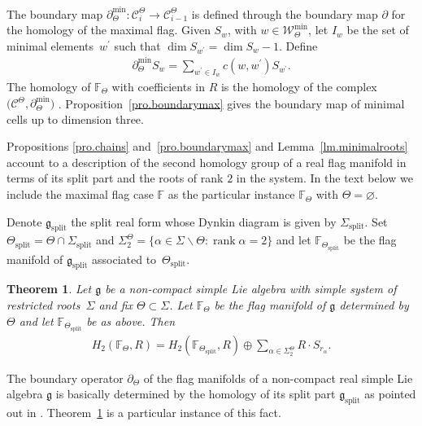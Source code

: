 \documentclass[10pt,a4paper]{amsart}
\numberwithin{equation}{section}
\newtheorem{Theorem}{Theorem}[section]
\begin{document}
The boundary map $\partial_\Theta^{\min}\colon \mathcal{C}_i^\Theta\longrightarrow \mathcal{C}_{i-1}^\Theta$ is defined through the boundary map $\partial$ for the homology of the maximal flag. Given $S_w$, with $w\in \mathcal{W}_\Theta^{\min}$, let $I_w$ be the set of minimal elements~$w^{\prime }$ such that $\dim S_{w^{\prime }}=\dim S_w-1$. Define
\begin{gather*} \partial^{\min}_\Theta S_w=\sum_{w^{\prime }\in I_w}c(w,w^{\prime })S_{w^{\prime }}.\end{gather*} The homology
of $\mathbb{F}_\Theta$ with coefficients in $R$ is the homo\-logy of the complex $\big(\mathcal{C}^\Theta,\partial^{\min}_\Theta\big)$ \cite[Theorem~3.4]{RSM}. Proposition~\ref{pro.boundarymax} gives the boundary map of minimal cells up to dimension three.

Propositions \ref{pro.chains} and~\ref{pro.boundarymax} and Lemma~\ref{lm.minimalroots} account to a description of the second homology group of a real flag manifold in terms of its split part and the roots of rank $2$ in the system. In the text below we include the maximal flag case $\mathbb F$ as the particular instance $\mathbb F_\Theta$ with $\Theta=\varnothing$.

Denote $\mathfrak{g }_{\mathrm{split}}$ the split real form whose Dynkin diagram is given by $\Sigma_{\mathrm{split}}$. Set $\Theta_{\mathrm{split}}=\Theta\cap\Sigma_{\mathrm{split}}$ and $\Sigma _{2}^{\Theta }=\{\alpha \in \Sigma \backslash \Theta \colon \operatorname{rank}\alpha =2\}$ and let $\mathbb{F}_{\Theta_{\mathrm{split}}}$ be the flag manifold of $\mathfrak{g }_{\mathrm{split}}$ associated to~$\Theta_{\mathrm{split}}$.

\begin{Theorem} \label{thm.nosplit}Let $\mathfrak{g}$ be a non-compact simple Lie algebra with simple system of restricted roots~$\Sigma $ and fix $\Theta\subset \Sigma $. Let $\mathbb{F}_{\Theta }$ be the flag manifold of $\mathfrak{g}$ determined by $\Theta $ and let $\mathbb{F}_{\Theta _{\mathrm{split}}}$ be as above. Then
\begin{gather*}
H_{2}(\mathbb{F}_\Theta,R)=H_{2}(\mathbb{F}_{\Theta _{\mathrm{split}}},R)\oplus \sum_{\alpha \in \Sigma _{2}^{\Theta }}R\cdot S_{r_{\alpha }}.
\end{gather*}
\end{Theorem}

\begin{Remark} The boundary operator $\partial _{\Theta }$ of the flag manifolds of a non-compact real simple Lie algebra $\mathfrak{g}$ is basically determined by the homology of its split part $\mathfrak{g}_{\mathrm{split}}$ as pointed out in \cite[p.~18]{RSM}. Theorem~\ref{thm.nosplit} is a particular instance of this fact.
\end{Remark}
\end{document}
